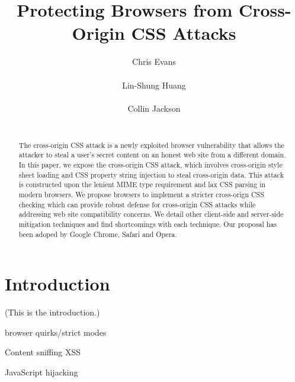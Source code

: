 \documentclass{acm_proc_article-sp}
\begin{document}
\title{Protecting Browsers from Cross-Origin CSS Attacks}

\author{
\alignauthor
Chris Evans\\
      \\
\alignauthor
Lin-Shung Huang\\
      \\
\alignauthor
Collin Jackson\\
      \\
}

\maketitle
\begin{abstract}
The cross-origin CSS attack is a newly exploited browser vulnerability that allows the attacker to steal a user's secret content on an honest web site from a different domain. In this paper, we expose the cross-origin CSS attack, which involves cross-origin style sheet loading and CSS property string injection to steal cross-origin data. This attack is constructed upon the lenient MIME type requirement and lax CSS parsing in modern browsers. We propose browsers to implement a stricter cross-orign CSS checking which can provide robust defense for cross-origin CSS attacks while addressing web site compatibility concerns. We detail other client-side and server-side mitigation techniques and find shortcomings with each technique. Our proposal has been adoped by Google Chrome, Safari and Opera.
\end{abstract}




\section{Introduction}
(This is the introduction.)

browser quirks/strict modes

Content sniffing XSS\cite{securecontentsniffing}

JavaScript hijacking\cite{jshijacking}
\end{document}

